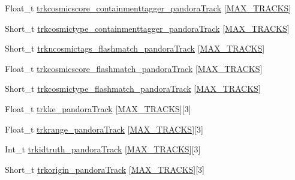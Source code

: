 \begin{DoxyCompactItemize}
\item 
Float\-\_\-t \hyperlink{classanatree_aaf70426c18fe33ee7e59fded27917fd2}{trkcosmicscore\-\_\-containmenttagger\-\_\-pandora\-Track} \mbox{[}\hyperlink{anatree__core__v09410002_8h_a327fd4e796e4a0d78947524c96e4362e}{M\-A\-X\-\_\-\-T\-R\-A\-C\-K\-S}\mbox{]}
\item 
Short\-\_\-t \hyperlink{classanatree_a84162faaef9881a405db1feeba798e38}{trkcosmictype\-\_\-containmenttagger\-\_\-pandora\-Track} \mbox{[}\hyperlink{anatree__core__v09410002_8h_a327fd4e796e4a0d78947524c96e4362e}{M\-A\-X\-\_\-\-T\-R\-A\-C\-K\-S}\mbox{]}
\item 
Short\-\_\-t \hyperlink{classanatree_a5b74564fd30cd13b6bfa1dd2c7bb23b2}{trkncosmictags\-\_\-flashmatch\-\_\-pandora\-Track} \mbox{[}\hyperlink{anatree__core__v09410002_8h_a327fd4e796e4a0d78947524c96e4362e}{M\-A\-X\-\_\-\-T\-R\-A\-C\-K\-S}\mbox{]}
\item 
Float\-\_\-t \hyperlink{classanatree_ab1de853f7c86b9f526671436a6e2de40}{trkcosmicscore\-\_\-flashmatch\-\_\-pandora\-Track} \mbox{[}\hyperlink{anatree__core__v09410002_8h_a327fd4e796e4a0d78947524c96e4362e}{M\-A\-X\-\_\-\-T\-R\-A\-C\-K\-S}\mbox{]}
\item 
Short\-\_\-t \hyperlink{classanatree_ab4993ea316d2ef41425aa7dc1a4681eb}{trkcosmictype\-\_\-flashmatch\-\_\-pandora\-Track} \mbox{[}\hyperlink{anatree__core__v09410002_8h_a327fd4e796e4a0d78947524c96e4362e}{M\-A\-X\-\_\-\-T\-R\-A\-C\-K\-S}\mbox{]}
\item 
Float\-\_\-t \hyperlink{classanatree_a2049a2b808b9af477b1d2381dad688cd}{trkke\-\_\-pandora\-Track} \mbox{[}\hyperlink{anatree__core__v09410002_8h_a327fd4e796e4a0d78947524c96e4362e}{M\-A\-X\-\_\-\-T\-R\-A\-C\-K\-S}\mbox{]}\mbox{[}3\mbox{]}
\item 
Float\-\_\-t \hyperlink{classanatree_a4d776d6480b303e29f417bf03bcb8dc6}{trkrange\-\_\-pandora\-Track} \mbox{[}\hyperlink{anatree__core__v09410002_8h_a327fd4e796e4a0d78947524c96e4362e}{M\-A\-X\-\_\-\-T\-R\-A\-C\-K\-S}\mbox{]}\mbox{[}3\mbox{]}
\item 
Int\-\_\-t \hyperlink{classanatree_a40d2f52edb643ad82ba20c86e2c74528}{trkidtruth\-\_\-pandora\-Track} \mbox{[}\hyperlink{anatree__core__v09410002_8h_a327fd4e796e4a0d78947524c96e4362e}{M\-A\-X\-\_\-\-T\-R\-A\-C\-K\-S}\mbox{]}\mbox{[}3\mbox{]}
\item 
Short\-\_\-t \hyperlink{classanatree_abaa417392908ce717ead8301fdf45296}{trkorigin\-\_\-pandora\-Track} \mbox{[}\hyperlink{anatree__core__v09410002_8h_a327fd4e796e4a0d78947524c96e4362e}{M\-A\-X\-\_\-\-T\-R\-A\-C\-K\-S}\mbox{]}\mbox{[}3\mbox{]}

\end{DoxyCompactItemize}
